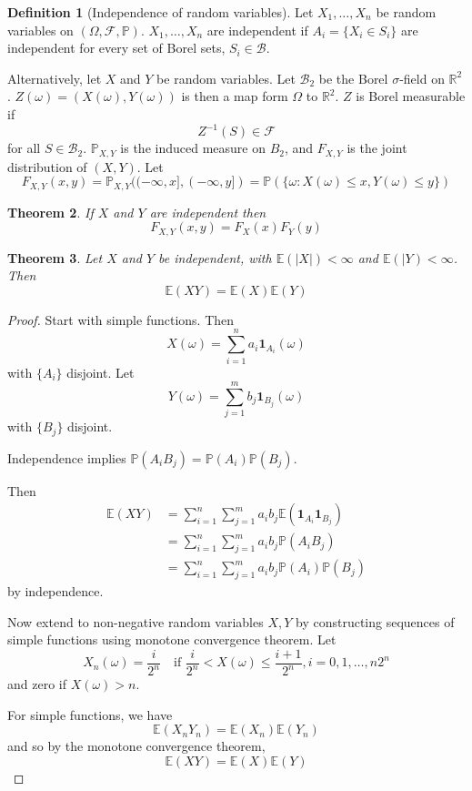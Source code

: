 \documentclass[10pt, oneside, reqno]{amsart}
\theoremstyle{plain}%
\newtheorem{thm}{Theorem}[section]
\theoremstyle{definition}
\newtheorem{defn}[thm]{Definition}
\theoremstyle{remark}
\newcommand{\sigf}{\mathcal{F}}
\newcommand{\R}{\mathbb{R}}
\newcommand{\E}{\mathbb{E}}
\renewcommand{\P}{\mathbb{P}}
\begin{document}
\begin{defn}[Independence of random variables]
	Let $X_{1}, \dots, X_n$ be random variables on $(\Omega, \sigf, \P)$.  $X_1, \dots, X_n$ are independent if $A_{i} = \{ X_i \in S_i \}$ are independent for every set of Borel sets, $S_i \in \mathcal{B}$.
	
	Alternatively, let $X$ and $Y$ be random variables.  Let $\mathcal{B}_2$ be the Borel $\sigma$-field on $\R^2$.  $Z(\omega) = (X(\omega), Y(\omega))$ is then a map form $\Omega$ to $\R^2$.  $Z$ is Borel measurable if \[
		Z^{-1}(S) \in \sigf
	\] for all $S \in \mathcal{B}_2$. 
	$\P_{X,Y}$ is the induced measure on $B_2$, and $F_{X,Y}$ is the joint distribution of $(X,Y)$.  Let \[
		F_{X,Y}(x,y) = \P_{X, Y} ( (-\infty,x], (-\infty,y] ) = \P( \{ \omega: X(\omega) \leq x, Y(\omega) \leq y \} ) 
	\] 
\end{defn}

\begin{thm}
	If $X$ and $Y$ are independent then \[
		F_{X,Y}(x,y) = F_X(x) F_Y(y)
	\]
\end{thm}

\begin{thm}
	Let $X$ and $Y$ be independent, with $\E(|X|) < \infty$ and $\E(|Y) < \infty$.  Then \[
		\E(XY) = \E(X) \E(Y)
	\]
\end{thm}

\begin{proof}
	Start with simple functions.  Then \[
		X(\omega) = \sum_{i=1}^n a_i \mathbf{1}_{A_i} (\omega)
	\] with $\{ A_i \}$ disjoint.
	Let \[Y(\omega) = \sum_{j=1}^m b_j \mathbf{1}_{B_j}(\omega) 
	\] with $\{ B_j \}$ disjoint.  
	
	Independence implies $\P(A_i B_j) = \P(A_i) \P(B_j)$.
	
	Then \begin{align*}
		\E(XY) &= \sum_{i=1}^n \sum_{j=1}^m a_i b_j \E( \mathbf{1}_{A_i} \mathbf{1}_{B_j} ) \\
				&= \sum_{i=1}^n \sum_{j=1}^m a_i b_j \P(A_i B_j) \\
				&= \sum_{i=1}^n \sum_{j=1}^m a_i b_j \P(A_i) \P(B_j)
	\end{align*} by independence.

	Now extend to non-negative random variables $X,Y$ by constructing sequences of simple functions using monotone convergence theorem.  Let \[
		X_n(\omega) = \frac{i}{2^n} \quad \text{if } \frac{i}{2^n} < X(\omega) \leq \frac{i+1}{2^n}, i = 0,1,\dots, n 2^n 
	\]and zero if $X(\omega) > n$.
	
	For simple functions, we have \[
		\E(X_n Y_n) = \E(X_n) \E(Y_n)
	\] and so by the monotone convergence theorem, \[
		\E(XY) = \E(X) \E(Y)
	\]
\end{proof}
\end{document}
